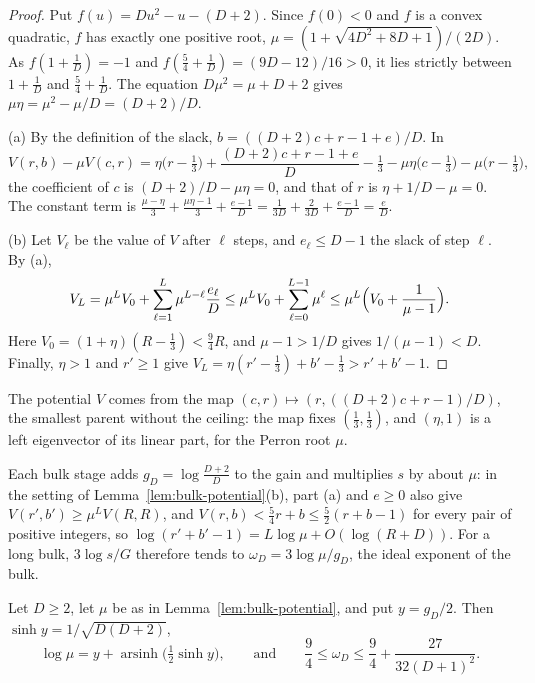 \begin{proof}
Put \(f(u)=Du^2-u-(D+2)\). Since \(f(0)<0\) and \(f\) is a convex
quadratic, \(f\) has exactly one positive root,
\(\mu=(1+\sqrt{4D^2+8D+1})/(2D)\). As \(f(1+\frac1D)=-1\) and
\(f(\frac54+\frac1D)=(9D-12)/16>0\), it lies strictly between
\(1+\frac1D\) and \(\frac54+\frac1D\). The equation \(D\mu^2=\mu+D+2\)
gives \(\mu\eta=\mu^2-\mu/D=(D+2)/D\).

(a) By the definition of the slack, \(b=((D+2)c+r-1+e)/D\). In
\[
 V(r,b)-\mu V(c,r)
 =\eta\bigl(r-\tfrac13\bigr)+\frac{(D+2)c+r-1+e}D-\tfrac13
 -\mu\eta\bigl(c-\tfrac13\bigr)-\mu\bigl(r-\tfrac13\bigr),
\]
the coefficient of \(c\) is \((D+2)/D-\mu\eta=0\), and that of \(r\) is
\(\eta+1/D-\mu=0\). The constant term is
\(\frac{\mu-\eta}3+\frac{\mu\eta-1}3+\frac{e-1}D
=\frac1{3D}+\frac2{3D}+\frac{e-1}D=\frac eD\).

(b) Let \(V_\ell\) be the value of \(V\) after \(\ell\) steps, and
\(e_\ell\le D-1\) the slack of step \(\ell\). By (a),
\[
 V_L=\mu^LV_0+\sum_{\ell=1}^L\mu^{L-\ell}\frac{e_\ell}D
 \le\mu^LV_0+\sum_{\ell=0}^{L-1}\mu^\ell
 \le\mu^L\Bigl(V_0+\frac1{\mu-1}\Bigr).
\]
Here \(V_0=(1+\eta)(R-\frac13)<\frac94R\), and \(\mu-1>1/D\) gives
\(1/(\mu-1)<D\). Finally, \(\eta>1\) and \(r'\ge1\) give
\(V_L=\eta(r'-\frac13)+b'-\frac13>r'+b'-1\).
\end{proof}

The potential \(V\) comes from the map \((c,r)\mapsto(r,((D+2)c+r-1)/D)\),
the smallest parent without the ceiling: the map fixes
\((\frac13,\frac13)\), and \((\eta,1)\) is a left eigenvector of its
linear part, for the Perron root \(\mu\).

Each bulk stage adds \(g_D=\log\frac{D+2}D\) to the gain and multiplies
\(s\) by about \(\mu\): in the setting of
Lemma~\ref{lem:bulk-potential}(b), part (a) and \(e\ge0\) also give
\(V(r',b')\ge\mu^LV(R,R)\), and \(V(r,b)<\frac54r+b\le\frac52(r+b-1)\)
for every pair of positive integers, so
\(\log(r'+b'-1)=L\log\mu+O(\log(R+D))\). For a long bulk,
\(3\log s/G\) therefore tends to \(\omega_D=3\log\mu/g_D\), the ideal
exponent of the bulk.

\begin{lemma}\label{lem:ideal-gap}
Let \(D\ge2\), let \(\mu\) be as in Lemma~\ref{lem:bulk-potential}, and
put \(y=g_D/2\). Then \(\sinh y=1/\sqrt{D(D+2)}\),
\[
 \log\mu=y+\operatorname{arsinh}\bigl(\tfrac12\sinh y\bigr),
 \qquad\text{and}\qquad
 \frac94\le\omega_D\le\frac94+\frac{27}{32(D+1)^2}.
\]
\end{lemma}


